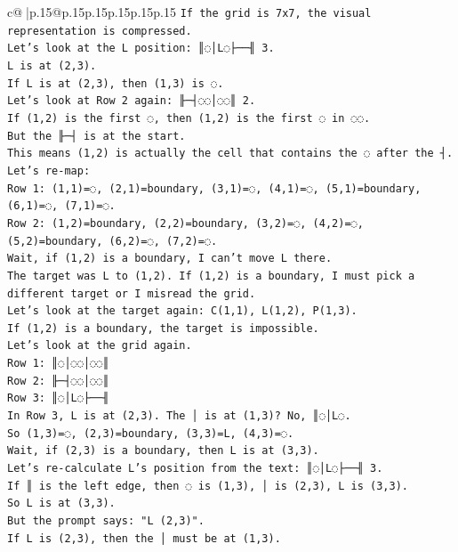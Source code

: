 \documentclass{article}
\begin{document}
{\begin{supertabular}{c@{$\;$}|p{.15\linewidth}@{}p{.15\linewidth}p{.15\linewidth}p{.15\linewidth}p{.15\linewidth}p{.15\linewidth}}
{{{\texttt{If the grid is 7x7, the visual representation is compressed.} \\
\texttt{Let's look at the L position: ║◌│L◌├──╢ 3.} \\
\texttt{L is at (2,3).} \\
\texttt{If L is at (2,3), then (1,3) is ◌.} \\
\texttt{Let's look at Row 2 again: ╟─┤◌◌│◌◌║ 2.} \\
\texttt{If (1,2) is the first ◌, then (1,2) is the first ◌ in ◌◌.} \\
\texttt{But the ╟─┤ is at the start.} \\
\texttt{This means (1,2) is actually the cell that contains the ◌ after the ┤.} \\
\texttt{Let's re{-}map:} \\
\texttt{Row 1: (1,1)=◌, (2,1)=boundary, (3,1)=◌, (4,1)=◌, (5,1)=boundary, (6,1)=◌, (7,1)=◌.} \\
\texttt{Row 2: (1,2)=boundary, (2,2)=boundary, (3,2)=◌, (4,2)=◌, (5,2)=boundary, (6,2)=◌, (7,2)=◌.} \\
\texttt{Wait, if (1,2) is a boundary, I can't move L there.} \\
\texttt{The target was L to (1,2). If (1,2) is a boundary, I must pick a different target or I misread the grid.} \\
\texttt{Let's look at the target again: C(1,1), L(1,2), P(1,3).} \\
\texttt{If (1,2) is a boundary, the target is impossible.} \\
\texttt{Let's look at the grid again.} \\
\texttt{Row 1: ║◌│◌◌│◌◌║} \\
\texttt{Row 2: ╟─┤◌◌│◌◌║} \\
\texttt{Row 3: ║◌│L◌├──╢} \\
\texttt{In Row 3, L is at (2,3). The │ is at (1,3)? No, ║◌│L◌.} \\
\texttt{So (1,3)=◌, (2,3)=boundary, (3,3)=L, (4,3)=◌.} \\
\texttt{Wait, if (2,3) is a boundary, then L is at (3,3).} \\
\texttt{Let's re{-}calculate L's position from the text: ║◌│L◌├──╢ 3.} \\
\texttt{If ║ is the left edge, then ◌ is (1,3), │ is (2,3), L is (3,3).} \\
\texttt{So L is at (3,3).} \\
\texttt{But the prompt says: "L (2,3)".} \\
\texttt{If L is (2,3), then the │ must be at (1,3).} \\
}}}
\end{supertabular}}
\end{document}
